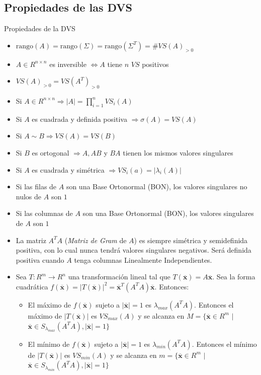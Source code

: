 \documentclass[a4paper, twoside]{article}
\numberwithin{equation}{section}
\numberwithin{figure}{section}
\numberwithin{table}{section}
\newcommand{\vect}[1]{\overline{\textbf{#1}}}
\newcommand{\rg}[1]{\text{rango}\left(#1\right)}
\newcommand{\dete}[1]{\left\vert #1 \right\vert}
\begin{document}
\subsection{Propiedades de las DVS}
\begin{corolario*}{Propiedades de la DVS}
	\begin{itemize}
		\item $\rg{A}=\rg{\Sigma}=\rg{\Sigma^T}=\# VS(A)_{>0}$
		\item $A \in R^{n \times n}$ es inversible $\Longleftrightarrow A$ tiene $n$ $VS$ positivos
		\item $VS(A)_{>0}=VS(A^T)_{>0}$
		\item Si $A \in R^{n \times n} \Rightarrow \dete{A}=\prod_{i=1}^n VS_i(A)$
		\item Si $A$ es cuadrada y definida positiva $\Rightarrow \sigma(A)=VS(A)$
		\item Si $A \sim B \Rightarrow VS(A)=VS(B)$
		\item Si $B$ es ortogonal $\Rightarrow A,AB$ y $BA$ tienen los mismos valores singulares
		\item Si $A$ es cuadrada y simétrica $\Rightarrow VS_i(a)=\vert \lambda_i(A) \vert$
		\item Si las filas de $A$ son una Base Ortonormal (BON), los valores singulares no nulos de $A$ son $1$
		\item Si las columnas de $A$ son una Base Ortonormal (BON), los valores singulares de $A$ son $1$
		\item La matriz $A^T A$ (\emph{Matriz de Gram} de $A$) es siempre simétrica y semidefinida positiva, con lo cual nunca tendrá valores singulares negativos. Será definida positiva cuando $A$ tenga columnas Linealmente Independientes.
		\item Sea $T:R^m \to R^n$ una transformación lineal tal que $T(\vect{x})=A\vect{x}$. Sea la forma cuadrática $f(\vect{x})=\vert T(\vect{x}) \vert^2=\vect{x}^T(A^T A)\vect{x}$. Entonces:
		\begin{itemize}
			\item El máximo de $f(\vect{x})$ sujeto a $\vert \vect{x} \vert=1$ es $\lambda_{max}\left(A^T A\right)$. Entonces el máximo de $\vert T(\vect{x}) \vert$ es $VS_{max}(A)$ y se alcanza en $M=\{\vect{x} \in R^m$ $\vert$ $\vect{x} \in S_{\lambda_{max}}\left(A^T A\right), \vert \vect{x} \vert=1 \}$
			\item El mínimo de $f(\vect{x})$ sujeto a $\vert \vect{x} \vert=1$ es $\lambda_{min}\left(A^T A\right)$. Entonces el mínimo de $\vert T(\vect{x}) \vert$ es $VS_{min}(A)$ y se alcanza en $m=\{\vect{x} \in R^m$ $\vert$ $\vect{x} \in S_{\lambda_{min}}\left(A^T A\right), \vert \vect{x} \vert=1 \}$
		\end{itemize}
	\end{itemize}
\end{corolario*}
\end{document}
